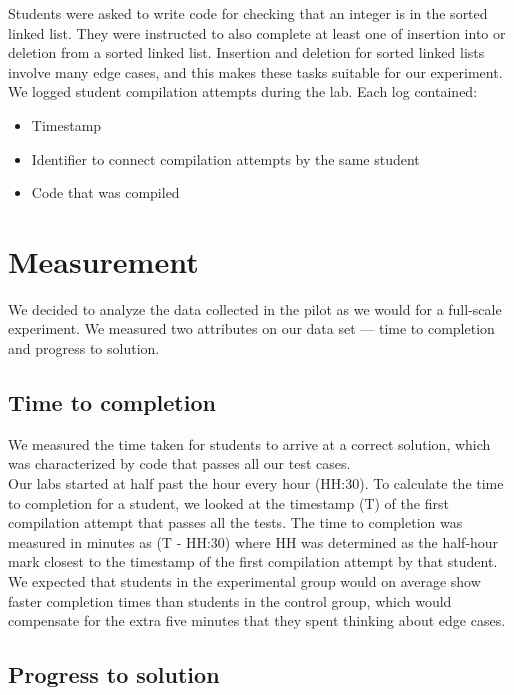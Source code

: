 \documentclass[11pt,letterpaper]{article}
\begin{document}
Students were asked to write code for checking that an integer is in the sorted linked list. They were instructed to also complete at least one of insertion into or deletion from a sorted linked list. Insertion and deletion for sorted linked lists involve many edge cases, and this makes these tasks suitable for our experiment.\\

We logged student compilation attempts during the lab. Each log contained:
\begin{itemize}
\item{Timestamp}
\item{Identifier to connect compilation attempts by the same student}
\item{Code that was compiled}
\end{itemize}

\section{Measurement}
\label{sec:measurement}

We decided to analyze the data collected in the pilot as we would for a full-scale experiment. We measured two attributes on our data set --- time to completion and progress to solution.

\subsection{Time to completion}
We measured the time taken for students to arrive at a correct solution, which was characterized by code that passes all our test cases.\\

Our labs started at half past the hour every hour (HH:30). To calculate the time to completion for a student, we looked at the timestamp (T) of the first compilation attempt that passes all the tests. The time to completion was measured in minutes as (T - HH:30) where HH was determined as the half-hour mark closest to the timestamp of the first compilation attempt by that student.\\

We expected that students in the experimental group would on average show faster completion times than students in the control group, which would compensate for the extra five minutes that they spent thinking about edge cases.

\subsection{Progress to solution}
\end{document}
